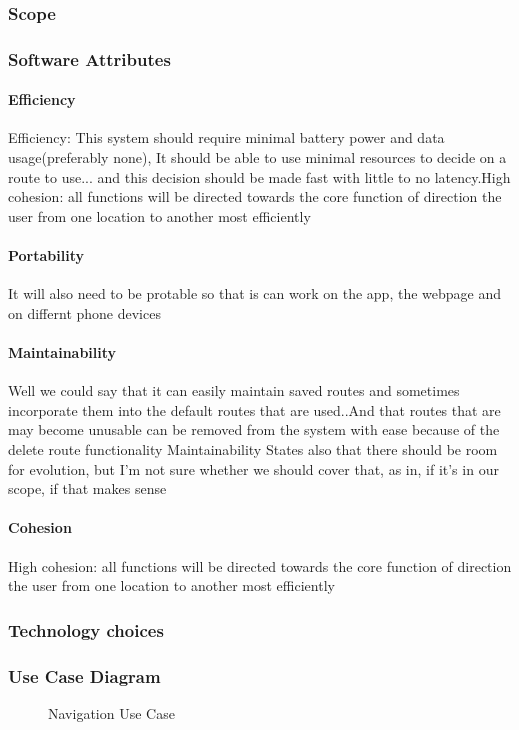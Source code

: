 \subsubsection{Scope}


\subsubsection{Software Attributes}

	\paragraph{Efficiency}
	Efficiency: This system should require minimal battery power and data usage(preferably none), It should be able to use minimal resources to decide on a route to use... and this decision should be made fast with little to no latency.High cohesion: all functions will be directed towards the core function of direction the user from one location to another most efficiently
	\paragraph{Portability}
	It will also need to be protable so that is can work on the app, the webpage and on differnt phone devices
	\paragraph{Maintainability}
	Well we could say that it can easily maintain saved routes and sometimes incorporate them into the default routes that are used..And that routes that are may become unusable can be removed from the system with ease because of the delete route functionality
	Maintainability States also that there should be room for evolution, but I'm not sure whether we should cover that, as in, if it's in our scope, if that makes sense
	\paragraph{Cohesion}
	High cohesion: all functions will be directed towards the core function of direction the user from one location to another most efficiently

\subsubsection{Technology choices}

\subsubsection{Use Case Diagram}
	\begin{figure}[h!]
	\caption{Navigation Use Case}
	\end{figure}

